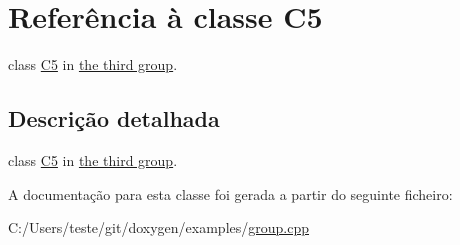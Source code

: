 \hypertarget{class_c5}{\section{Referência à classe C5}
\label{class_c5}
}


class \hyperlink{class_c5}{C5} in \hyperlink{group__group3}{the third group}.  




\subsection{Descrição detalhada}
class \hyperlink{class_c5}{C5} in \hyperlink{group__group3}{the third group}. 

A documentação para esta classe foi gerada a partir do seguinte ficheiro\-:\begin{DoxyCompactItemize}
\item 
C\-:/\-Users/teste/git/doxygen/examples/\hyperlink{group_8cpp}{group.\-cpp}\end{DoxyCompactItemize}
